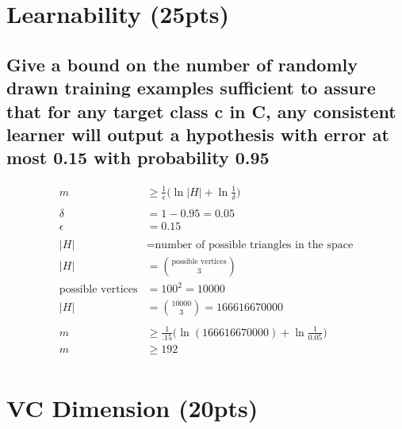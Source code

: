 \documentclass[11pt]{article}
\begin{document}
\section{Learnability (25pts)}

\subsection{Give a bound on the number of randomly drawn training examples sufficient to assure that for any target class c in C, any consistent learner will output a hypothesis with error at most 0.15 with probability 0.95}

\begin{align*}
	m &\geq \frac{1}{\epsilon}\bigg(\ln \vert H \vert + \ln\frac{1}{\delta}\bigg)\\
	\\
	\delta &= 1-0.95 = 0.05\\
	\epsilon &= 0.15\\
	\\
	\vert H \vert &= \text{number of possible triangles in the space}\\
	\vert H \vert &= {{\text{possible vertices}}\choose{3}}\\
	\text{possible vertices} &= 100^2 = 10000\\
	\vert H \vert &= {{10000}\choose{3}}=166616670000\\
	\\
	m &\geq \frac{1}{.15}\bigg(\ln(166616670000) + \ln\frac{1}{0.05}\bigg)\\
	m &\geq 192\\
\end{align*}

\section{VC Dimension (20pts)}
\end{document}
